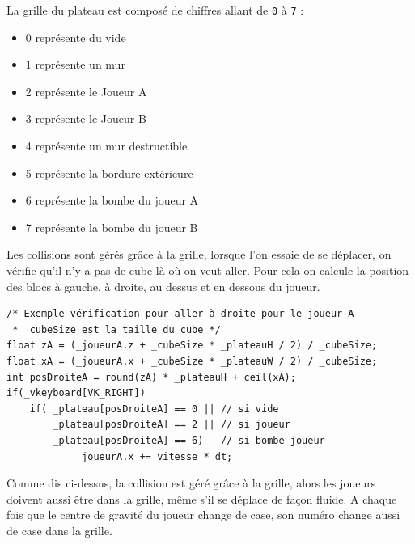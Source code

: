 \documentclass{article}
\begin{document}
    La grille du plateau est composé de chiffres allant de \texttt{0} à \texttt{7} :
    \begin{itemize}
        \item 0 représente du vide
        \item 1 représente un mur
        \item 2 représente le Joueur A
        \item 3 représente le Joueur B
        \item 4 représente un mur destructible
        \item 5 représente la bordure extérieure
        \item 6 représente la bombe du joueur A
        \item 7 représente la bombe du joueur B
    \end{itemize}
    \vspace{10pt}

    Les collisions sont gérés grâce à la grille, lorsque l'on essaie de se déplacer, on vérifie qu'il n'y a pas de cube là où on veut aller. Pour cela on calcule la position des blocs à gauche, à droite, au dessus et en dessous du joueur.
    \begin{center}\begin{minipage}{0.9\textwidth}
        \begin{verbatim}
/* Exemple vérification pour aller à droite pour le joueur A
 * _cubeSize est la taille du cube */
float zA = (_joueurA.z + _cubeSize * _plateauH / 2) / _cubeSize;
float xA = (_joueurA.x + _cubeSize * _plateauW / 2) / _cubeSize;
int posDroiteA = round(zA) * _plateauH + ceil(xA);
if(_vkeyboard[VK_RIGHT])
    if( _plateau[posDroiteA] == 0 || // si vide
        _plateau[posDroiteA] == 2 || // si joueur
        _plateau[posDroiteA] == 6)   // si bombe-joueur
            _joueurA.x += vitesse * dt;
        \end{verbatim}
    \end{minipage}\end{center}
    \vspace{10pt}

    Comme dis ci-dessus, la collision est géré grâce à la grille, alors les joueurs doivent aussi être dans la grille, même s'il se déplace de façon fluide. A chaque fois que le centre de gravité du joueur change de case, son numéro change aussi de case dans la grille.
    \vspace{10pt}
\end{document}
